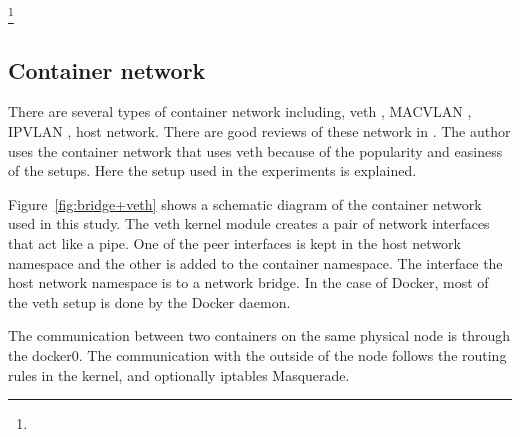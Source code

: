 \footnote{}

\subsection{Container network}

There are several types of container network including, veth \cite{bhattiprolu2008virtual}, MACVLAN \cite{rathore2010performance}, IPVLAN \cite{ipvlan}, host network.
There are good reviews of these network in  \cite{Marmol2015,claassen2016linux,struye2017assessing}.
The author uses the container network that uses veth because of the popularity and easiness of the setups.
Here the setup used in the experiments is explained.

Figure~\ref{fig:bridge+veth} shows a schematic diagram of the container network used in this study.
The veth kernel module creates a pair of network interfaces that act like a pipe.
One of the peer interfaces is kept in the host network namespace and the other is added to the container namespace.
The interface  the host network namespace is  to a network bridge.
In the case of Docker, most of the veth setup is done by the Docker daemon.

The communication between two containers on the same physical node is through the docker0.
The communication with the outside of the node follows the routing rules in the kernel, and optionally iptables Masquerade.  

